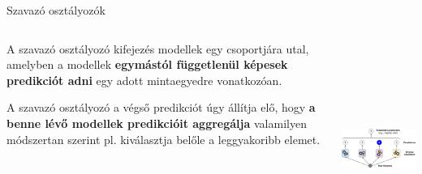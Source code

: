 \documentclass[english, aspectratio=169]{beamer}
\begin{document}
\begin{frame}{Szavazó osztályozók}
\begin{columns}
\begin{column}{.5\textwidth}
A szavazó osztályozó kifejezés modellek egy csoportjára utal, amelyben a modellek \textbf{egymástól függetlenül képesek predikciót adni} egy adott mintaegyedre vonatkozóan.\par\smallskip
A szavazó osztályozó a végső predikciót úgy állítja elő, hogy \textbf{a benne lévő modellek predikcióit aggregálja} valamilyen módszertan szerint pl. kiválasztja belőle a leggyakoribb elemet. 
\end{column}
\begin{column}{.5\textwidth}
\begin{center}
\includegraphics[width=7cm, height=7cm, keepaspectratio]{images/ensemble_3.png}
\end{center}
\end{column}
\end{columns}
\end{frame}
\end{document}
